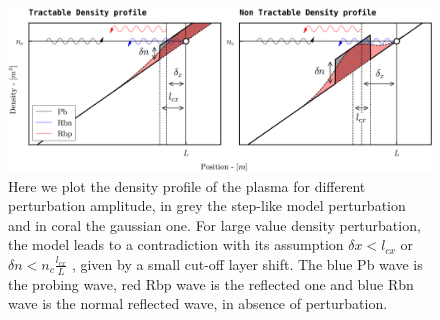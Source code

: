 \documentclass[11pt,a4paper,openany]{report}
\begin{document}
\begin{figure}[H]
    \centering
    \hspace*{-0.8cm}\includegraphics[width = 1.03\linewidth]{./figures/density_profile.png}
    \caption{Here we plot the density profile of the plasma for different perturbation amplitude, in grey the step-like model perturbation and in coral the gaussian one. For large value density perturbation, the model leads to a contradiction with its assumption $\delta x < l_{cx}$ or $\delta n < n_c \frac{l_{cx}}{L}$ , given by a small cut-off layer shift. The blue Pb wave is the probing wave, red Rbp wave is the reflected one and blue Rbn wave is the normal reflected wave, in absence of perturbation.}
    \label{Density_profile}
\end{figure}
\end{document}
